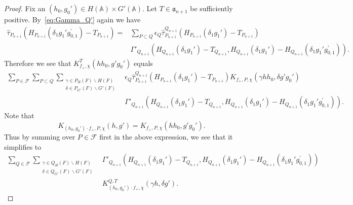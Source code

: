 \documentclass[letterpaper,11pt]{amsart}
\newcommand{\fa}{\mathfrak{a}}
\newcommand{\bA}{\mathbb{A}}
\newcommand{\cF}{\mathcal{F}}
\newcommand{\<}{\negthickspace}
\theoremstyle{definition}
\theoremstyle{plain}
\theoremstyle{remark}
\numberwithin{equation}{section}
\begin{document}
\begin{proof}
Fix an $(h_0,g_0') \in H(\bA) \times G'(\bA)$. Let $T \in \fa_{n+1}$ be
sufficiently positive. By~\eqref{eq:Gamma_Q'} again we have
    \begin{align*}
     \widehat{\tau}_{P_{n+1}}(H_{P_{n+1}}(\delta_1 g_1'g_{0,1}^{\prime})
     -T_{P_{n+1}})
     = & \sum_{P \subset Q}  \epsilon_Q \widehat{\tau}_{P_{n+1}}^{Q_{n+1}}
     ( H_{P_{n+1}}(\delta_1 g_1') - T_{P_{n+1}} )\\
     &\Gamma'_{Q_{n+1}} ( H_{Q_{n+1}}(\delta_1 g_1')-T_{Q_{n+1}},H_{Q_{n+1}}
     (\delta_1 g_1') - H_{Q_{n+1}}(\delta_1 g_1' g_{0,1}^{\prime})).
    \end{align*}
Therefore we see that $K_{f_+,\chi}^T(h h_0, g' g_0')$ equals
    \[
    \begin{aligned}
    \sum_{P \in \cF}
    \sum_{P \subset Q} \sum_{ \substack{\gamma \in P_H(F)
    \backslash H(F) \\ \delta \in P_{G'}(F)\backslash G'(F)}}
    & \epsilon_Q \widehat{\tau}_{P_{n+1}}^{Q_{n+1}}
     ( H_{P_{n+1}}(\delta_1 g_1') - T_{P_{n+1}} )
     K_{f_+, P, \chi}(\gamma h h_0,\delta g' g_0')\\
    &\Gamma'_{Q_{n+1}}(H_{Q_{n+1}}(\delta_1 g_1')-T_{Q_{n+1}},H_{Q_{n+1}}
    (\delta_1 g_1')-H_{Q_{n+1}}(\delta_1 g_1' g_{0,1}^{\prime})).
    \end{aligned}
    \]
Note that
    \[
    K_{(h_0, g_0') \cdot f_+, P, \chi}(h,g')=
    K_{f_+, P, \chi}(h h_0, g' g_0').
    \]
Thus by summing over $P \in \cF$ first in  the above expression, we see that
it simplifies to
    \begin{equation}    \label{eq:invariance_GL_1}
    \begin{aligned}
    \sum_{Q \in \cF} \sum_{ \substack{\gamma \in Q_H(F)
    \backslash H(F) \\ \delta \in Q_{G'}(F)\backslash G'(F)}}
    &\Gamma'_{Q_{n+1}}(H_{Q_{n+1}}(\delta_1 g_1')-T_{Q_{n+1}},H_{Q_{n+1}}
    (\delta_1 g_1')-H_{Q_{n+1}}(\delta_1 g_1' g_{0,1}^{\prime}))\\
    &K_{(h_0, g_0') \cdot f_+, \chi}^{Q, T}(\gamma h,\delta g').
    \end{aligned}
    \end{equation}


\end{proof}
\end{document}
